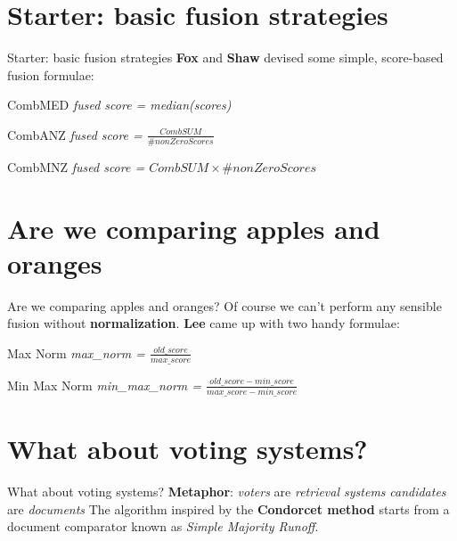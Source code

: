 \documentclass{beamer}
\begin{document}
        \section{Starter: basic fusion strategies}

	\begin{frame}{Starter: basic fusion strategies}
                \textbf {Fox} and \textbf{Shaw} devised some simple, score-based fusion formulae:
		\begin{block}{CombMED}
		       \textit{fused score = median(scores)} 
		\end{block}

		\begin{alertblock}{CombANZ}
		       \textit{fused score = $\frac{CombSUM}{\#nonZeroScores}$}   
		\end{alertblock}

		\begin{exampleblock}{CombMNZ}
		       \textit{fused score = $CombSUM \times \#nonZeroScores$}  
		\end{exampleblock}
	\end{frame}

        \section{Are we comparing apples and oranges}

        \begin{frame}{Are we comparing apples and oranges?}
               Of course we can't perform any sensible fusion without \textbf{normalization}. \newline
               \textbf{Lee} came up with two handy formulae:
               	\begin{block}{Max Norm}
		       \textit{max\_norm = $\frac{old\_score}{max\_score}$} 
		\end{block}
                \begin{alertblock}{Min Max Norm}
		       \textit{min\_max\_norm = $\frac{old\_score - min\_score}{max\_score - min\_score}$}    
		\end{alertblock}
               
	\end{frame}

        \section{What about voting systems?}

        \begin{frame}{What about voting systems?}
               \textbf{Metaphor}: \textit{voters} are \textit{retrieval systems} \newline
                \hspace*{18mm}  \textit{candidates} are \textit{documents} \newline   
               The algorithm inspired by the \textbf{Condorcet method} starts from a
               document comparator known as \textit{Simple Majority Runoff}. \newline
               
	\end{frame}
\end{document}
